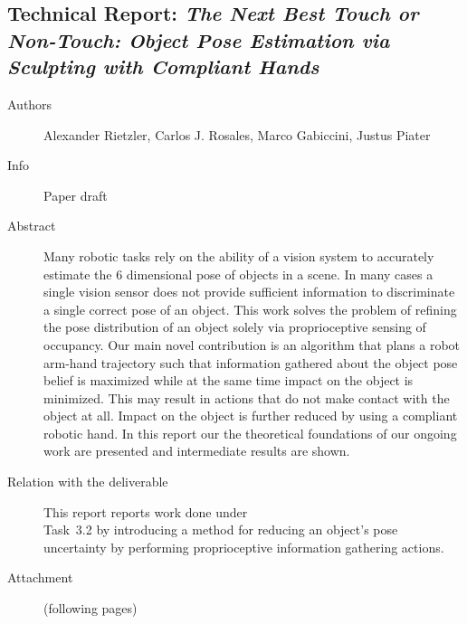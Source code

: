 \documentclass[a4paper,11pt,pdf]{pacmanreport}
\begin{document}
\subsection{Technical Report: \em The Next Best Touch or Non-Touch:
Object Pose Estimation via Sculpting with Compliant Hands}
\begin{description}
    \item[Authors] Alexander Rietzler, Carlos J. Rosales, Marco Gabiccini, Justus Piater
    \item[Info] Paper draft%
    \item[Abstract] Many robotic tasks rely on the ability of a vision system to accurately estimate the 6 dimensional pose of objects in a scene.
In many cases a single vision sensor does not provide sufficient information to discriminate a single correct
pose of an object. This work solves the problem of refining the pose distribution 
of an object solely via proprioceptive sensing of occupancy.
Our main novel contribution is an algorithm that plans a robot arm-hand trajectory such that 
information gathered about the object pose belief is maximized while at the same time impact on the object is minimized. 
This may result in actions that do not make contact with the object at all.
Impact on the object is further reduced by using a compliant robotic hand.
In this report our the theoretical foundations of our ongoing work are presented and intermediate results are shown. %

    \item [Relation with the deliverable] This report reports work done under\\ Task~3.2 by introducing a method for reducing an object's pose uncertainty by performing proprioceptive information
    gathering actions.
    \item[Attachment] (following pages) %
\end{description}

\end{document}
